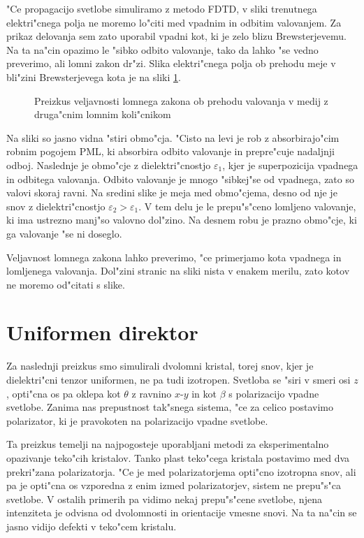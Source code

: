 \documentclass[12pt,twoside,openright,final]{report}
\begin{document}
"Ce propagacijo svetlobe simuliramo z metodo \ac{FDTD}, v sliki trenutnega elektri"cnega polja ne moremo lo"citi med vpadnim in odbitim valovanjem. 
Za prikaz delovanja sem zato uporabil vpadni kot, ki je zelo blizu Brewsterjevemu. 
Na ta na"cin opazimo le "sibko odbito valovanje, tako da lahko "se vedno preverimo, ali lomni zakon dr"zi. 
Slika elektri"cnega polja ob prehodu meje v bli"zini Brewsterjevega kota je na sliki \ref{fig:refraction-test}. 

\begin{figure}[h]
 \centering
 \vspace{-1.4cm}
 
 \vspace{-1.7cm}
 \caption{Preizkus veljavnosti lomnega zakona ob prehodu valovanja v medij z druga"cnim lomnim koli"cnikom}
 \label{fig:refraction-test}
\end{figure}

Na sliki so jasno vidna "stiri obmo"cja. 
"Cisto na levi je rob z absorbirajo"cim robnim pogojem \ac{PML}, ki absorbira odbito valovanje in prepre"cuje nadaljnji odboj. 
Naslednje je obmo"cje z dielektri"cnostjo $\varepsilon_1$, kjer je superpozicija vpadnega in odbitega valovanja. 
Odbito valovanje je mnogo "sibkej"se od vpadnega, zato so valovi skoraj ravni. 
Na sredini slike je meja med obmo"cjema, desno od nje je snov z dielektri"cnostjo $\varepsilon_2 > \varepsilon_1$.
V tem delu je le prepu"s"ceno lomljeno valovanje, ki ima ustrezno manj"so valovno dol"zino. 
Na desnem robu je prazno obmo"cje, ki ga valovanje "se ni doseglo. 

Veljavnost lomnega zakona lahko preverimo, "ce primerjamo kota vpadnega in lomljenega valovanja. 
Dol"zini stranic na sliki nista v enakem merilu, zato kotov ne moremo od"citati s slike. 

\section{Uniformen direktor}
Za naslednji preizkus smo simulirali dvolomni kristal, torej snov, kjer je dielektri"cni tenzor uniformen, ne pa tudi izotropen. 
Svetloba se "siri v smeri osi $z$, opti"cna os pa oklepa kot $\theta$ z ravnino $x$-$y$ in kot $\beta$ s polarizacijo vpadne svetlobe. 
Zanima nas prepustnost tak"snega sistema, "ce za celico postavimo polarizator, ki je pravokoten na polarizacijo vpadne svetlobe. 

Ta preizkus temelji na najpogosteje uporabljani metodi za eksperimentalno opazivanje teko"cih kristalov. 
Tanko plast teko"cega kristala postavimo med dva prekri"zana polarizatorja. 
"Ce je med polarizatorjema opti"cno izotropna snov, ali pa je opti"cna os vzporedna z enim izmed polarizatorjev, sistem ne prepu"s"ca svetlobe. 
V ostalih primerih pa vidimo nekaj prepu"s"cene svetlobe, njena intenziteta je odvisna od dvolomnosti in orientacije vmesne snovi. 
Na ta na"cin se jasno vidijo defekti v teko"cem kristalu. 
\end{document}
